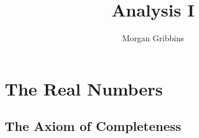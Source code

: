 \documentclass[12pt,letterpaper]{article}
\title{Analysis I}
\author{Morgan Gribbins}
\date{}
\begin{document}
	
\maketitle
\tableofcontents
\pagebreak

\section{The Real Numbers}

\subsection{The Axiom of Completeness}
\end{document}
